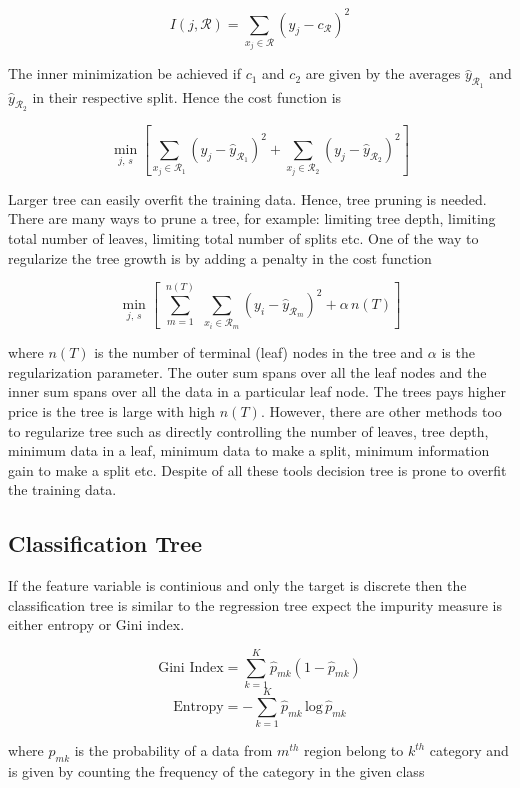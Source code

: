 \documentclass[11pt]{article}
\theoremstyle{definition}
\begin{document}
$$
I(j, \mathcal{R}) = \sum_{x_j \in \mathcal{R}} (y_j - c_\mathcal{R})^2 
$$


The inner minimization be achieved if $c_1$ and $c_2$ are given by the averages $\hat{y}_{\mathcal{R}_1}$ and $\hat{y}_{\mathcal{R}_2}$ in their respective split. Hence the cost function is 

$$
\min_{j,\, s} \left[ \sum_{x_j \in \mathcal{R}_1} \left(y_j - \hat{y}_{\mathcal{R}_1} \right)^2 + \sum_{x_j \in \mathcal{R}_2} \left(y_j -  \hat{y}_{\mathcal{R}_2} \right)^2 \right]
$$

Larger tree can easily overfit the training data. Hence, tree pruning is needed. There are many ways to prune a tree, for example: limiting tree depth, limiting total number of leaves, limiting total number of splits etc. One of the way to regularize the tree growth is by adding a penalty in the cost function 

$$
\min_{j,\, s} \left[\,\, \sum_{m=1}^{n(T)} \, \, \sum_{x_i \in \mathcal{R}_m} \left(y_i - \hat{y}_{\mathcal{R}_m}\right)^2 + \alpha \, n(T) \right]
$$

where  $n(T)$ is the number of terminal (leaf) nodes in the tree and $\alpha$ is the regularization parameter. The outer sum spans over all the leaf nodes and the inner sum spans over all the data in a particular leaf node. The trees pays higher price is the tree is large with high $n(T)$. However, there are other methods too to regularize tree such as directly controlling the number of leaves, tree depth, minimum data in a leaf, minimum data to make a split, minimum information gain to make a split etc. Despite of all these tools decision tree is prone to overfit the training data.



\subsection{Classification Tree }

If the feature variable is continious and only the target is discrete then the classification tree is similar to the regression tree expect the impurity measure is either entropy or Gini index. 

$$
\text{Gini Index} = \sum_{k=1}^K \hat{p}_{mk} (1 - \hat{p}_{mk})
$$
$$
\text{Entropy} = - \sum_{k=1}^K \hat{p}_{mk}\, \text{log}\,\hat{p}_{mk} 
$$

where $\hat{p}_{mk}$ is the probability of a data from $m^{th}$ region belong to $k^{th}$ category and is given by counting the frequency of the category in the given class
\end{document}
